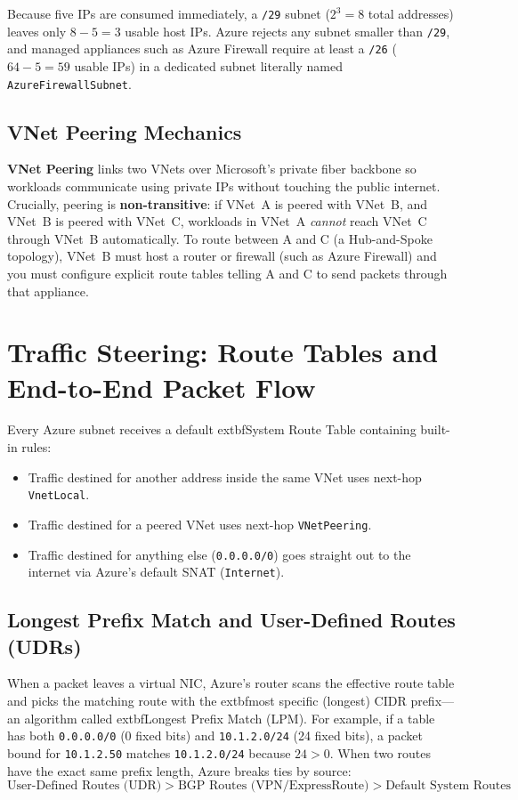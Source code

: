 \begin{productionwarningbox}
Because five IPs are consumed immediately, a \texttt{/29} subnet ($2^3 = 8$ total addresses) leaves only $8 - 5 = 3$ usable host IPs. Azure rejects any subnet smaller than \texttt{/29}, and managed appliances such as Azure Firewall require at least a \texttt{/26} ($64 - 5 = 59$ usable IPs) in a dedicated subnet literally named \texttt{AzureFirewallSubnet}.
\end{productionwarningbox}

\subsection{VNet Peering Mechanics}
\textbf{VNet Peering} links two VNets over Microsoft's private fiber backbone so workloads communicate using private IPs without touching the public internet. Crucially, peering is \textbf{non-transitive}: if VNet~A is peered with VNet~B, and VNet~B is peered with VNet~C, workloads in VNet~A \emph{cannot} reach VNet~C through VNet~B automatically. To route between A and C (a Hub-and-Spoke topology), VNet~B must host a router or firewall (such as Azure Firewall) and you must configure explicit route tables telling A and C to send packets through that appliance.

\section{Traffic Steering: Route Tables and End-to-End Packet Flow}

Every Azure subnet receives a default 	extbf{System Route Table} containing built-in rules:
\begin{itemize}[leftmargin=12pt]
  \item Traffic destined for another address inside the same VNet uses next-hop \texttt{VnetLocal}.
  \item Traffic destined for a peered VNet uses next-hop \texttt{VNetPeering}.
  \item Traffic destined for anything else (\texttt{0.0.0.0/0}) goes straight out to the internet via Azure's default SNAT (\texttt{Internet}).
\end{itemize}

\subsection{Longest Prefix Match and User-Defined Routes (UDRs)}
When a packet leaves a virtual NIC, Azure's router scans the effective route table and picks the matching route with the 	extbf{most specific (longest) CIDR prefix}—an algorithm called 	extbf{Longest Prefix Match (LPM)}. For example, if a table has both \texttt{0.0.0.0/0} (0 fixed bits) and \texttt{10.1.2.0/24} (24 fixed bits), a packet bound for \texttt{10.1.2.50} matches \texttt{10.1.2.0/24} because $24 > 0$. When two routes have the exact same prefix length, Azure breaks ties by source:
\begin{equation}
\text{User-Defined Routes (UDR)} > \text{BGP Routes (VPN/ExpressRoute)} > \text{Default System Routes}
\end{equation}

